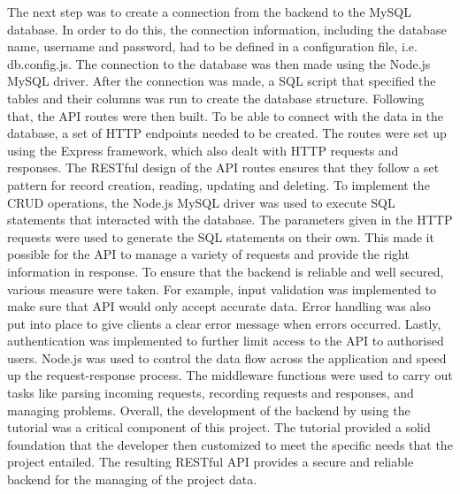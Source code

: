 The next step was to create a connection from the backend to the MySQL database. In order to do this, the connection information, including the database name, username and password, had to be defined in a configuration file, i.e. db.config.js. The connection to the database was then made using the Node.js MySQL driver. After the connection was made, a SQL script that specified the tables and their columns was run to create the database structure. 
\newline \newline
Following that, the API routes were then built. To be able to connect with the data in the database, a set of HTTP endpoints needed to be created. The routes were set up using the Express framework, which also dealt with HTTP requests and responses. The RESTful design of the API routes ensures that they follow a set pattern for record creation, reading, updating and deleting. To implement the CRUD operations, the Node.js MySQL driver was used to execute SQL statements that interacted with the database. The parameters given in the HTTP requests were used to generate the SQL statements on their own. This made it possible for the API to manage a variety of requests and provide the right information in response. 
\newline \newline
To ensure that the backend is reliable and well secured, various measure were taken. For example, input validation was implemented to make sure that API would only accept accurate data. Error handling was also put into place to give clients a clear error message when errors occurred. Lastly, authentication was implemented to further limit access to the API to authorised users.
Node.js was used to control the data flow across the application and speed up the request-response process. The middleware functions were used to carry out tasks like parsing incoming requests, recording requests and responses, and managing problems.
\newline \newline
Overall, the development of the backend by using the tutorial \cite{bezkoder} was a critical component of this project.  The tutorial provided a solid foundation that the developer then customized to meet the specific needs that the project entailed. The resulting RESTful API provides a secure and reliable backend for the managing of the project data.



